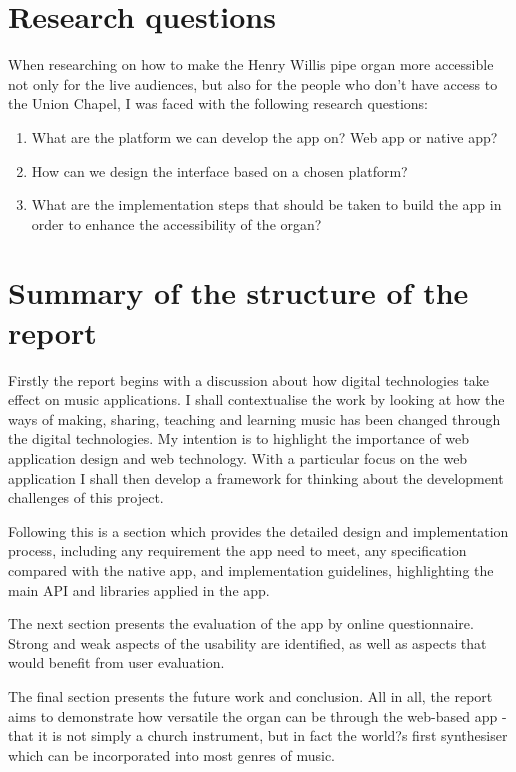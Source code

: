 \section{Research questions}

When researching on how to make the Henry Willis pipe organ more accessible not only for the live audiences, but also for the people who don't have access to the Union Chapel, I was faced with the following research questions:

\begin{enumerate}
\item What are the platform we can develop the app on? Web app or native app?
\item How can we design the interface based on a chosen platform?
\item What are the implementation steps that should be taken to build the app in order to enhance the accessibility of the organ?
\end{enumerate}

\section{Summary of the structure of the report}

Firstly the report begins with a discussion about how digital technologies take effect on music applications. I shall contextualise the work by looking at how the ways of making, sharing, teaching and learning music has been changed through the digital technologies. My intention is to highlight the importance of web application design and web technology. With a particular focus on the web application I shall then develop a framework for thinking about the development challenges of this project.

Following this is a section which provides the detailed design and implementation process, including any requirement the app need to meet, any specification compared with the native app, and implementation guidelines, highlighting the main API and libraries applied in the app.

The next section presents the evaluation of the app by online questionnaire. Strong and weak aspects of the usability are identified, as well as aspects that would benefit from user evaluation.

The final section presents the future work and conclusion. All in all, the report aims to demonstrate how versatile the organ can be through the web-based app - that it is not simply a church instrument, but in fact the world?s first synthesiser which can be incorporated into most genres of music.
